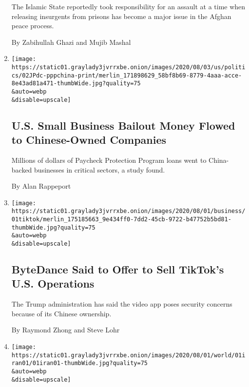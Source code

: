 \begin{enumerate}
  The Islamic State reportedly took responsibility for an assault at a
  time when releasing insurgents from prisons has become a major issue
  in the Afghan peace process.

  By Zabihullah Ghazi and Mujib Mashal
\item
  \href{/2020/08/02/us/politics/virus-china-ppp-small-business-loans.html}{}

  \texttt{[image: https://static01.graylady3jvrrxbe.onion/images/2020/08/03/us/politics/02JPdc-pppchina-print/merlin\_171898629\_58bf8b69-8779-4aaa-acce-8e43ad81a471-thumbWide.jpg?quality=75\\\&auto=webp\\\&disable=upscale]}

  \hypertarget{us-small-business-bailout-money-flowed-to-chinese-owned-companies}{%
  \subsection{U.S. Small Business Bailout Money Flowed to Chinese-Owned
  Companies}\label{us-small-business-bailout-money-flowed-to-chinese-owned-companies}}

  Millions of dollars of Paycheck Protection Program loans went to
  China-backed businesses in critical sectors, a study found.

  By Alan Rappeport
\item
  \href{/2020/08/01/technology/tiktok-sale-trump-ban.html}{}

  \texttt{[image: https://static01.graylady3jvrrxbe.onion/images/2020/08/01/business/01tiktok/merlin\_175185663\_9e434ff0-7dd2-45cb-9722-b47752b5bd81-thumbWide.jpg?quality=75\\\&auto=webp\\\&disable=upscale]}

  \hypertarget{bytedance-said-to-offer-to-sell-tiktoks-us-operations}{%
  \subsection{ByteDance Said to Offer to Sell TikTok's U.S.
  Operations}\label{bytedance-said-to-offer-to-sell-tiktoks-us-operations}}

  The Trump administration has said the video app poses security
  concerns because of its Chinese ownership.

  By Raymond Zhong and Steve Lohr
\item
  \href{/2020/08/01/world/asia/iran-khamenei-us-sanctions.html}{}

  \texttt{[image: https://static01.graylady3jvrrxbe.onion/images/2020/08/01/world/01iran01/01iran01-thumbWide.jpg?quality=75\\\&auto=webp\\\&disable=upscale]}


\end{enumerate}
